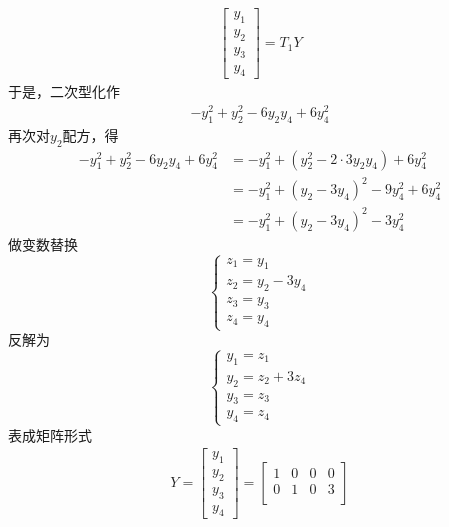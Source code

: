 \documentclass{article}
\begin{document}
\begin{itemize}
\begin{align*}
\begin{bmatrix}
            y_1 \\
            y_2 \\
            y_3 \\
            y_4
          \end{bmatrix}
          = T_1 Y
        \end{align*}
        于是，二次型化作
        \begin{align*}
          - y_1^2 + y_2^2 - 6 y_2 y_4 + 6 y_4^2
        \end{align*}
        再次对$y_2$配方，得
        \begin{align*}
          - y_1^2 + y_2^2 - 6 y_2 y_4 + 6 y_4^2
           & = - y_1^2 + (y_2^2 - 2 \cdot 3 y_2 y_4) + 6 y_4^2 \\
           & = - y_1^2 + (y_2 - 3y_4)^2 - 9 y_4^2 + 6 y_4^2    \\
           & = - y_1^2 + (y_2 - 3y_4)^2 - 3 y_4^2
        \end{align*}
        做变数替换
        \begin{equation*}
          \begin{cases*}
            z_1 = y_1        \\
            z_2 = y_2 - 3y_4 \\
            z_3 = y_3        \\
            z_4 = y_4
          \end{cases*}
        \end{equation*}
        反解为
        \begin{equation*}
          \begin{cases}
            y_1 = z_1        \\
            y_2 = z_2 + 3z_4 \\
            y_3 = z_3        \\
            y_4 = z_4
          \end{cases}
        \end{equation*}
        表成矩阵形式
        \begin{align*}
          Y = \begin{bmatrix}
                y_1 \\
                y_2 \\
                y_3 \\
                y_4
              \end{bmatrix}
          = \begin{bmatrix}
              1 & 0 & 0 & 0 \\
              0 & 1 & 0 & 3 \\

\end{bmatrix}
\end{align*}
\end{itemize}
\end{document}
